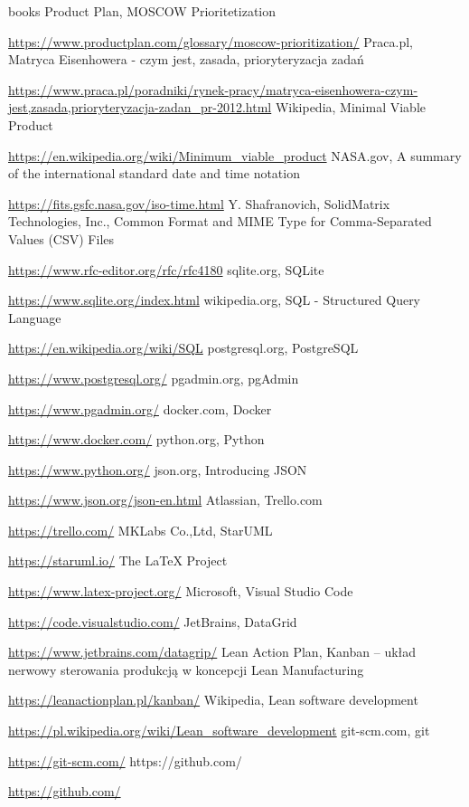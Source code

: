 \documentclass[a4paper,10pt, twoside]{report}
\begin{document}
\begin{large}
\begin{thebibliography} {books}
     Product Plan, MOSCOW Prioritetization \raggedright\url{
        https://www.productplan.com/glossary/moscow-prioritization/}
    Praca.pl, Matryca Eisenhowera - czym jest, zasada, prioryteryzacja zadań \raggedright\url{
        https://www.praca.pl/poradniki/rynek-pracy/matryca-eisenhowera-czym-jest,zasada,prioryteryzacja-zadan_pr-2012.html}
     Wikipedia, Minimal Viable Product \raggedright\url{
        https://en.wikipedia.org/wiki/Minimum_viable_product}
     NASA.gov, A summary of the international standard date and time notation \raggedright\url{
        https://fits.gsfc.nasa.gov/iso-time.html}
     Y. Shafranovich, SolidMatrix Technologies, Inc., Common Format and MIME Type for Comma-Separated Values (CSV) Files \raggedright\url{
        https://www.rfc-editor.org/rfc/rfc4180}
     sqlite.org, SQLite \raggedright\url{
        https://www.sqlite.org/index.html}
     wikipedia.org, SQL - Structured Query Language \raggedright\url{
        https://en.wikipedia.org/wiki/SQL}
     postgresql.org, PostgreSQL \raggedright\url{
        https://www.postgresql.org/}
     pgadmin.org, pgAdmin \raggedright\url{
        https://www.pgadmin.org/}
     docker.com, Docker \raggedright\url{
        https://www.docker.com/}
     python.org, Python \raggedright\url{
        https://www.python.org/}
     json.org, Introducing JSON \raggedright\url{
        https://www.json.org/json-en.html}
     Atlassian, Trello.com \raggedright\url{
        https://trello.com/}
     MKLabs Co.,Ltd, StarUML \raggedright\url{
        https://staruml.io/}
     The LaTeX Project \raggedright\url{
        https://www.latex-project.org/}
     Microsoft, Visual Studio Code \raggedright\url{
        https://code.visualstudio.com/}
     JetBrains, DataGrid \raggedright\url{
        https://www.jetbrains.com/datagrip/}
     Lean Action Plan, Kanban – układ nerwowy sterowania produkcją w koncepcji Lean Manufacturing \raggedright\url{
        https://leanactionplan.pl/kanban/}
     Wikipedia, Lean software development \raggedright\url{
        https://pl.wikipedia.org/wiki/Lean_software_development}
     git-scm.com, git \raggedright\url{
        https://git-scm.com/}
     https://github.com/ \raggedright\url{
        https://github.com/}

\end{thebibliography}
\end{large}
\end{document}
